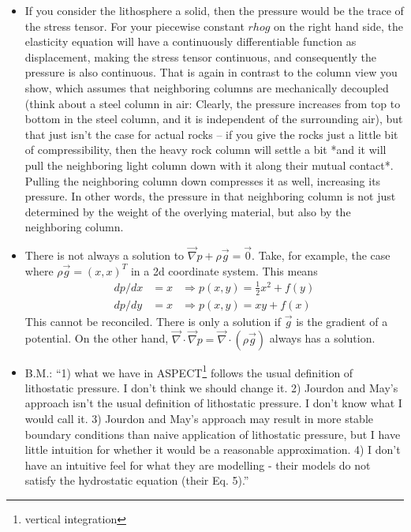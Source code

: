 \begin{itemize}
\item If you consider the lithosphere a solid, then the pressure would be the trace of the stress tensor. 
For your piecewise constant $rho g$ on the right hand side, the elasticity equation will have a 
continuously differentiable function as displacement, making the stress tensor continuous, 
and consequently the pressure is also continuous. That is again in contrast to the column view you show, 
which assumes that neighboring columns are mechanically decoupled (think about a steel column in air: 
Clearly, the pressure increases from top to bottom in the steel column, and it is independent of the surrounding air), 
but that just isn't the case for actual rocks -- if you give the rocks just a little bit of compressibility, 
then the heavy rock column will settle a bit *and it will pull the neighboring light column down with it 
along their mutual contact*. Pulling the neighboring column down compresses it as well, 
increasing its pressure. In other words, the pressure in that neighboring column is not just determined 
by the weight of the overlying material, but also by the neighboring column.

\item There is not always a solution to $\vec\nabla p + \rho \vec{g} = \vec{0}$. 
Take, for example, the case where
$\rho \vec{g} = (x,x)^T$ in a 2d coordinate system. This means
\begin{align}
  dp/dx  &= x  &\Rightarrow   p(x,y) = \frac12 x^2 + f(y) \\
  dp/dy  &= x  &\Rightarrow   p(x,y) = xy + f(x) 
\end{align}
This cannot be reconciled. There is only a solution if $\vec{g}$ is the gradient of a potential.
On the other hand, $\vec\nabla\cdot \vec\nabla  p = \vec\nabla \cdot (\rho \vec{g})$ always has a solution. 

\item B.M.: ``1) what we have in ASPECT\footnote{vertical integration} follows the usual definition of 
lithostatic pressure. I don't think we should change it.
2) Jourdon and May's approach isn't the usual definition of lithostatic pressure. I don't know what I would call it.
3) Jourdon and May's approach may result in more stable boundary conditions than naive application of lithostatic 
pressure, but I have little intuition for whether it would be a reasonable approximation.
4) I don't have an intuitive feel for what they are modelling - their models do not satisfy the hydrostatic equation (their Eq. 5).''


\end{itemize}
